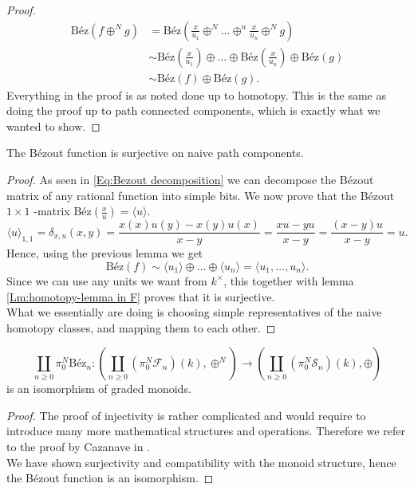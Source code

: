 \begin{lemma}
\begin{proof}
\begin{align*}
     \text{Béz}(f\oplus^N g)
     &= \text{Béz}(\frac{x}{u_1}\oplus^N \dots \oplus^n  \frac{x}{u_n}\oplus^N g) \\
     &\sim \text{Béz}(\frac{x}{u_1})\oplus \dots \oplus  \text{Béz}(\frac{x}{u_n})\oplus \text{Béz}(g) \\
     &\sim \text{Béz}(f)\oplus \text{Béz}(g).
\end{align*}
%
Everything in the proof is as noted done up to homotopy. This is the same as doing the proof up to path connected components, which is exactly what we wanted to show. 
\end{proof}
%
\end{lemma}
%
\begin{lemma}\label{lm:Bez surjection on naive path components}
The Bézout function is surjective on naive path components. 
%
\begin{proof}
As seen in \cref{Eq:Bezout decomposition} we can decompose the Bézout matrix of any rational function into simple bits. We now prove that the Bézout \(1 \times 1\) -matrix \(\text{Béz}(\frac{x}{u}) = \langle u \rangle \).
%
\begin{equation*}
   \langle u\rangle _{1,1} = \delta_{x,u}(x,y) 
   = \frac{x(x)u(y)-x(y)u(x)}{x-y} 
   = \frac{xu-yu}{x-y}
   = \frac{(x-y)u}{x-y} = u.
\end{equation*}
%
Hence, using the previous lemma we get
\begin{equation*}
    \text{Béz}(f) \sim \langle u_1\rangle \oplus \dots \oplus \langle u_n\rangle  = \langle u_1, \dots, u_n\rangle .
\end{equation*}
%
Since we can use any units we want from \(k^{\times}\), this together with lemma \ref{Lm:homotopy-lemma in F} proves that it is surjective. \\
What we essentially are doing is choosing simple representatives of the naive homotopy classes, and mapping them to each other.
\end{proof}
%
\end{lemma}
%
\begin{corollary}\label{cor:Bez is an iso}
%
\begin{equation*}
    \displaystyle\coprod_{n\geq0}\pi^N_0 \text{Béz}_n:(\displaystyle\coprod_{n\geq 0}(\pi^N_0\mathcal{F}_n)(k),\oplus^N)\longrightarrow (\displaystyle\coprod_{n\geq 0}(\pi^N_0 \mathcal{S}_n)(k),\oplus)
\end{equation*}
is an isomorphism of graded monoids.
%
\begin{proof}
%
The proof of injectivity is rather complicated and would require to introduce many more mathematical structures and operations. Therefore we refer to the proof by Cazanave in \cite[3.6]{Cazanave}. \\
We have shown surjectivity and compatibility with the monoid structure, hence the Bézout function is an isomorphism.
%
\end{proof}
%
\end{corollary}

